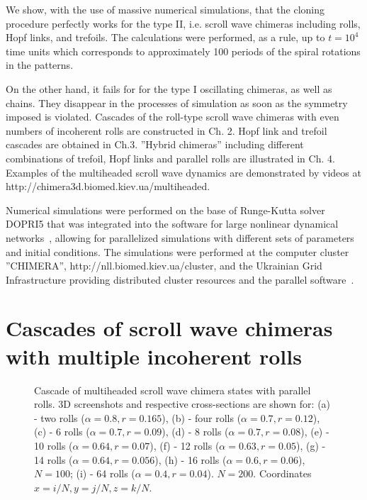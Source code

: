 \documentclass[epjST]{svjour}
\begin{document}
We show, with the use of massive numerical simulations,  that the cloning procedure perfectly works for the type II, i.e. scroll wave chimeras including rolls, Hopf links, and trefoils. The calculations were performed, as a rule, up to $t=10^{4}$ time units which corresponds to approximately 100 periods of the spiral rotations in the patterns. 

On the other hand, it fails for for the type I oscillating chimeras, as well as  chains. They disappear in the processes of simulation as soon as the symmetry imposed is violated.  Cascades of the roll-type scroll wave chimeras  with even numbers of  incoherent rolls  are constructed in Ch. 2.  Hopf link and trefoil cascades are obtained in Ch.3.  ''Hybrid chimeras'' including different combinations of trefoil, Hopf links and parallel rolls are illustrated in Ch. 4.   Examples of the multiheaded scroll wave dynamics are demonstrated by videos at 
http://chimera3d.biomed.kiev.ua/multiheaded.

Numerical simulations were performed on the base of Runge-Kutta solver DOPRI5 that was integrated into
the software for large nonlinear dynamical networks~\cite{sls2011}, allowing for parallelized simulations
with different sets of parameters and initial conditions. The simulations were performed at the computer cluster ''CHIMERA'', http://nll.biomed.kiev.ua/cluster, and the Ukrainian Grid Infrastructure
providing distributed cluster resources and the parallel software~\cite{zssb2007}.



\section {Cascades of scroll wave chimeras with multiple incoherent rolls}

\begin{figure}[ht!]
 \caption{Cascade of multiheaded scroll wave chimera states with parallel rolls.  3D screenshots and respective cross-sections are shown for: (a) - two rolls ($\alpha=0.8, r=0.165$), (b) - four rolls ($\alpha=0.7, r=0.12$), (c) - 6 rolls ($\alpha=0.7, r=0.09$), (d) - 8 rolls ($\alpha=0.7, r=0.08$),
(e) - 10 rolls ($\alpha=0.64, r=0.07$), (f) - 12 rolls ($\alpha=0.63, r=0.05$), (g) - 14 rolls ($\alpha=0.64, r=0.056$), (h) - 16 rolls ($\alpha=0.6, r=0.06$), $N=100$; (i) - 64 rolls ($\alpha=0.4, r=0.04$). $N=200$. 
 Coordinates  $x=i/N,  y=j/N,  z=k/N$. } 
  \label{fig:2}
\end{figure}
\end{document}
